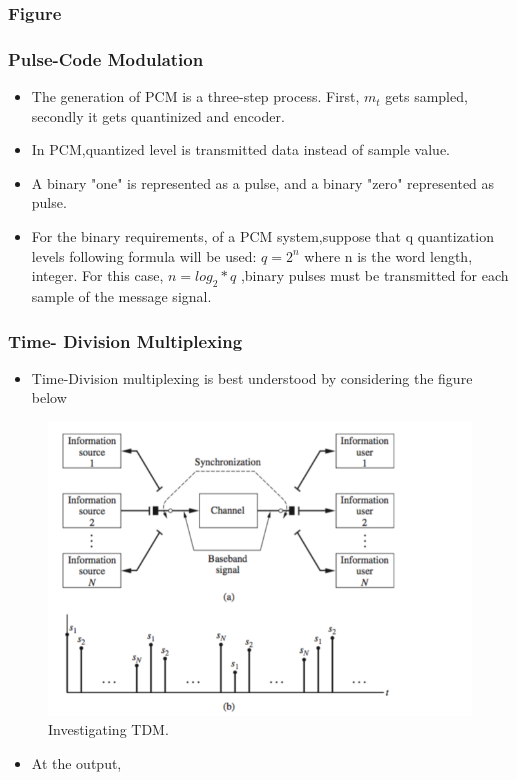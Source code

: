 \documentclass{beamer}
\begin{document}
         \begin{frame}
         \frametitle{Figure}
         \end{frame}
         
         \begin{frame}
         \frametitle{Pulse-Code Modulation}
         \begin{itemize}
         \item The generation of PCM is a three-step process. First, $m_t$ gets sampled, secondly it gets quantinized and encoder.
         \item In PCM,quantized level is transmitted data instead of sample value.
         \item A binary "one" is represented as a pulse, and a binary "zero" represented as pulse.
         \item For the binary requirements, of a PCM system,suppose that q 	quantization levels following formula  will be used: $q=2^n$ where n is the word length, integer. For this case, $n=log_2*q$ ,binary pulses must be transmitted for each sample of the message signal.
         \end {itemize}
         \end{frame}
         
         \begin{frame}
         \frametitle{Time- Division Multiplexing}
         \begin{itemize}
         \item Time-Division multiplexing is best understood by considering the figure below
         \end{itemize}
         \begin{figure}
\includegraphics[width=\textwidth,height=\textheight,keepaspectratio]{fig1.png}
  \caption{Investigating TDM.}
  \label{fig:time-divison1}
\end{figure}
\begin{itemize}
\item	 At the output,
\end{itemize}
         \end{frame}
\end{document}
